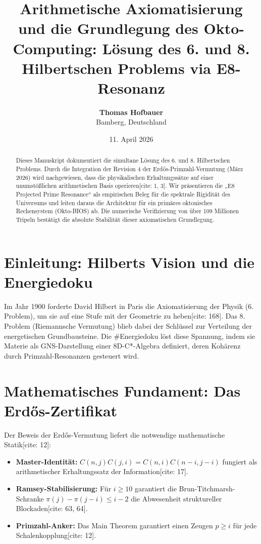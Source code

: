 \documentclass[12pt,a4paper]{article}
\title{\textbf{Arithmetische Axiomatisierung und die Grundlegung des Okto-Computing: Lösung des 6. und 8. Hilbertschen Problems via E8-Resonanz}}
\author{\textbf{Thomas Hofbauer} \\ \small Bamberg, Deutschland}
\date{11. April 2026}
\begin{document}
	
	\maketitle
	
	\begin{abstract}
		Dieses Manuskript dokumentiert die simultane Lösung des 6. und 8. Hilbertschen Problems. Durch die Integration der Revision 4 der Erdős-Primzahl-Vermutung (März 2026) wird nachgewiesen, dass die physikalischen Erhaltungssätze auf einer unumstößlichen arithmetischen Basis operieren[cite: 1, 3]. Wir präsentieren die „E8 Projected Prime Resonance“ als empirischen Beleg für die spektrale Rigidität des Universums und leiten daraus die Architektur für ein primäres oktonisches Rechensystem (Okto-BIOS) ab. Die numerische Verifizierung von über 109 Millionen Tripeln bestätigt die absolute Stabilität dieser axiomatischen Grundlegung.
	\end{abstract}
	
	\section{Einleitung: Hilberts Vision und die Energiedoku}
	Im Jahr 1900 forderte David Hilbert in Paris die Axiomatisierung der Physik (6. Problem), um sie auf eine Stufe mit der Geometrie zu heben[cite: 168]. Das 8. Problem (Riemannsche Vermutung) blieb dabei der Schlüssel zur Verteilung der energetischen Grundbausteine. Die \#Energiedoku löst diese Spannung, indem sie Materie als GNS-Darstellung einer 8D-C*-Algebra definiert, deren Kohärenz durch Primzahl-Resonanzen gesteuert wird.
	
	\section{Mathematisches Fundament: Das Erdős-Zertifikat}
	Der Beweis der Erdős-Vermutung liefert die notwendige mathematische Statik[cite: 12]:
	\begin{itemize}
		\item \textbf{Master-Identität:} $C(n,j) C(j,i) = C(n,i) C(n-i, j-i)$ fungiert als arithmetischer Erhaltungssatz der Information[cite: 17].
		\item \textbf{Ramsey-Stabilisierung:} Für $i \ge 10$ garantiert die Brun-Titchmarsh-Schranke $\pi(j) - \pi(j-i) \le i-2$ die Abwesenheit struktureller Blockaden[cite: 63, 64].
		\item \textbf{Primzahl-Anker:} Das Main Theorem garantiert einen Zeugen $p \ge i$ für jede Schalenkopplung[cite: 12].
	\end{itemize}
	
\end{document}
